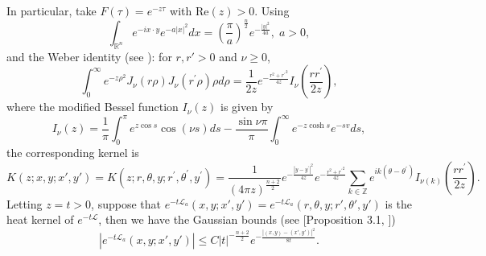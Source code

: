 \documentclass[a4paper,11pt, reqno]{amsart}
\numberwithin{equation}{section}
\theoremstyle{plain}
\theoremstyle{definition}
\theoremstyle{remark}
\begin{document}
In particular, take \( F(\tau) = e^{-z\tau} \) with \( \text{Re}(z) > 0 \). Using 
\begin{equation*}
\int_{\mathbb{R} ^n}{e^{-ix\cdot y}e^{-a\left| x \right|^2}dx=\left( \frac{\pi}{a} \right) ^{\frac{n}{2}}e^{-\frac{\left| y \right|^2}{4a}}},\;a>0,
\end{equation*}
and the Weber identity (see \cite{taylor1996}): for $r,r'>0$ and $\nu\geq0$,
\begin{equation*}
\int_0^{\infty}e^{-z\rho ^2}J_\nu(r\rho )J_\nu(r^{\prime} \rho )\rho d\rho =\frac{1}{2z}e^{-\frac{r^2+{r^{\prime}}^2}{4z}}I_\nu\left( \frac{rr^{\prime}}{2z} \right), 
\end{equation*}
where the modified Bessel function $I_\nu(z)$ is given by
\begin{equation*}
	I_\nu(z) = \frac{1}{\pi} \int_0^\pi e^{z\cos s} \cos(\nu s) ds - \frac{\sin \nu \pi}{\pi} \int_0^\infty e^{-z\cosh s} e^{-sv} ds,
\end{equation*}
the corresponding kernel is
\begin{equation*}
K(z; x,y;x',y')=K(z; r, \theta, y; r^{\prime}, \theta^{\prime}, y^{\prime}) 
=\frac{1}{(4\pi z)^\frac{n+2}{2}}e^{-\frac{|y-y^{\prime}|^2}{4z}}e^{-\frac{r^2+{r^{\prime}}^2}{4z}}\sum_{k\in \mathbb{Z}}e^{ik(\theta -\theta ^{\prime})}I_{\nu (k)}\left( \frac{rr^{\prime}}{2z} \right).
\end{equation*}
Letting $z=t>0$, suppose that $e^{-t\mathcal{L}_{a}}(x,y;x',y')=e^{-t\mathcal{L}_{a}}(r,\theta,y;r',\theta',y')$ is the heat kernel of $e^{-t\mathcal{L}}$, then we have the Gaussian bounds (see [Proposition 3.1, ]) 
\begin{equation*}
|e^{-t\mathcal{L}_a}(x,y;x',y')|\leq C|t|^{-\frac{n+2}{2}}e^{-\frac{|(x,y)-(x',y')|^2}{8t}}.
\end{equation*}
\end{document}
